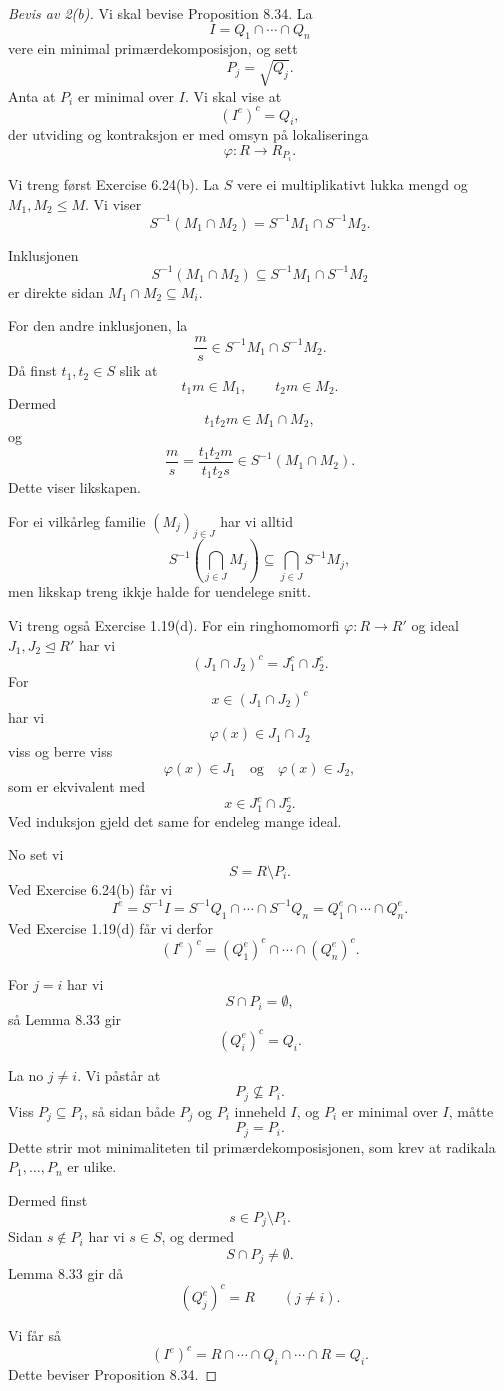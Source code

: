 \documentclass[11pt]{article}
\begin{document}
\begin{proof}[Bevis av 2(b)]
Vi skal bevise Proposition 8.34. La
\[
I=Q_1\cap\cdots\cap Q_n
\]
vere ein minimal primærdekomposisjon, og sett
\[
P_j=\sqrt{Q_j}.
\]
Anta at $P_i$ er minimal over $I$. Vi skal vise at
\[
(I^e)^c=Q_i,
\]
der utviding og kontraksjon er med omsyn på
lokaliseringa
\[
\varphi:R\to R_{P_i}.
\]

Vi treng først Exercise 6.24(b). La $S$ vere ei
multiplikativt lukka mengd og $M_1,M_2\leq M$.
Vi viser
\[
S^{-1}(M_1\cap M_2)
=
S^{-1}M_1\cap S^{-1}M_2.
\]

Inklusjonen
\[
S^{-1}(M_1\cap M_2)
\subseteq
S^{-1}M_1\cap S^{-1}M_2
\]
er direkte sidan $M_1\cap M_2\subseteq M_i$.

For den andre inklusjonen, la
\[
\frac ms\in S^{-1}M_1\cap S^{-1}M_2.
\]
Då finst $t_1,t_2\in S$ slik at
\[
t_1m\in M_1,
\qquad
t_2m\in M_2.
\]
Dermed
\[
t_1t_2m\in M_1\cap M_2,
\]
og
\[
\frac ms
=
\frac{t_1t_2m}{t_1t_2s}
\in
S^{-1}(M_1\cap M_2).
\]
Dette viser likskapen.

For ei vilkårleg familie $(M_j)_{j\in J}$ har vi alltid
\[
S^{-1}\left(\bigcap_{j\in J}M_j\right)
\subseteq
\bigcap_{j\in J}S^{-1}M_j,
\]
men likskap treng ikkje halde for uendelege snitt.

Vi treng også Exercise 1.19(d). For ein ringhomomorfi
$\varphi:R\to R'$ og ideal $J_1,J_2\trianglelefteq R'$
har vi
\[
(J_1\cap J_2)^c
=
J_1^c\cap J_2^c.
\]
For
\[
x\in (J_1\cap J_2)^c
\]
har vi
\[
\varphi(x)\in J_1\cap J_2
\]
viss og berre viss
\[
\varphi(x)\in J_1
\quad\text{og}\quad
\varphi(x)\in J_2,
\]
som er ekvivalent med
\[
x\in J_1^c\cap J_2^c.
\]
Ved induksjon gjeld det same for endeleg mange ideal.

No set vi
\[
S=R\setminus P_i.
\]
Ved Exercise 6.24(b) får vi
\[
I^e
=
S^{-1}I
=
S^{-1}Q_1\cap\cdots\cap S^{-1}Q_n
=
Q_1^e\cap\cdots\cap Q_n^e.
\]
Ved Exercise 1.19(d) får vi derfor
\[
(I^e)^c
=
(Q_1^e)^c\cap\cdots\cap(Q_n^e)^c.
\]

For $j=i$ har vi
\[
S\cap P_i=\emptyset,
\]
så Lemma 8.33 gir
\[
(Q_i^e)^c=Q_i.
\]

La no $j\neq i$. Vi påstår at
\[
P_j\not\subseteq P_i.
\]
Viss $P_j\subseteq P_i$, så sidan både $P_j$ og $P_i$
inneheld $I$, og $P_i$ er minimal over $I$, måtte
\[
P_j=P_i.
\]
Dette strir mot minimaliteten til primærdekomposisjonen,
som krev at radikala $P_1,\ldots,P_n$ er ulike.

Dermed finst
\[
s\in P_j\setminus P_i.
\]
Sidan $s\notin P_i$ har vi $s\in S$, og dermed
\[
S\cap P_j\neq\emptyset.
\]
Lemma 8.33 gir då
\[
(Q_j^e)^c=R
\qquad (j\neq i).
\]

Vi får så
\[
(I^e)^c
=
R\cap\cdots\cap Q_i\cap\cdots\cap R
=
Q_i.
\]
Dette beviser Proposition 8.34.
\end{proof}
\end{document}
